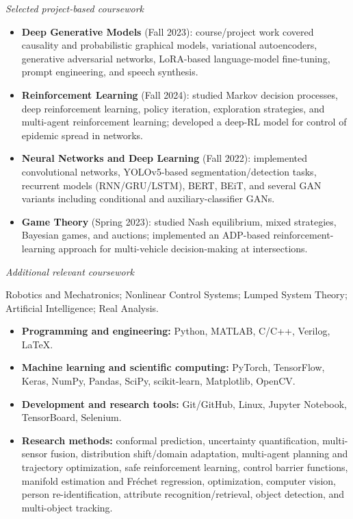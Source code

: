 \documentclass[letterpaper,10pt]{article}
\newcommand{\cvsection}[1]{%
  \Needspace{4\baselineskip}%
  \par\addvspace{11pt}%
  \noindent\marginpar{\vspace{1pt}\RaggedRight\small\scshape #1}%
  \ignorespaces
}
\newcommand{\cvsubsection}[1]{%
  \Needspace{3\baselineskip}%
  \par\addvspace{7pt}\noindent\textit{#1}\par\vspace{3pt}%
}
\begin{document}
\cvsubsection{Selected project-based coursework}
\begin{itemize}
  \item \textbf{Deep Generative Models} (Fall 2023): course/project work covered causality and probabilistic graphical models, variational autoencoders, generative adversarial networks, LoRA-based language-model fine-tuning, prompt engineering, and speech synthesis.
  \item \textbf{Reinforcement Learning} (Fall 2024): studied Markov decision processes, deep reinforcement learning, policy iteration, exploration strategies, and multi-agent reinforcement learning; developed a deep-RL model for control of epidemic spread in networks.
  \item \textbf{Neural Networks and Deep Learning} (Fall 2022): implemented convolutional networks, YOLOv5-based segmentation/detection tasks, recurrent models (RNN/GRU/LSTM), BERT, BEiT, and several GAN variants including conditional and auxiliary-classifier GANs.
  \item \textbf{Game Theory} (Spring 2023): studied Nash equilibrium, mixed strategies, Bayesian games, and auctions; implemented an ADP-based reinforcement-learning approach for multi-vehicle decision-making at intersections.
\end{itemize}

\cvsubsection{Additional relevant coursework}
Robotics and Mechatronics; Nonlinear Control Systems; Lumped System Theory; Artificial Intelligence; Real Analysis.

\cvsection{Technical\\Skills}
\begin{itemize}
  \item \textbf{Programming and engineering:} Python, MATLAB, C/C++, Verilog, \LaTeX.
  \item \textbf{Machine learning and scientific computing:} PyTorch, TensorFlow, Keras, NumPy, Pandas, SciPy, scikit-learn, Matplotlib, OpenCV.
  \item \textbf{Development and research tools:} Git/GitHub, Linux, Jupyter Notebook, TensorBoard, Selenium.
  \item \textbf{Research methods:} conformal prediction, uncertainty quantification, multi-sensor fusion, distribution shift/domain adaptation, multi-agent planning and trajectory optimization, safe reinforcement learning, control barrier functions, manifold estimation and Fr\'echet regression, optimization, computer vision, person re-identification, attribute recognition/retrieval, object detection, and multi-object tracking.
\end{itemize}
\end{document}
